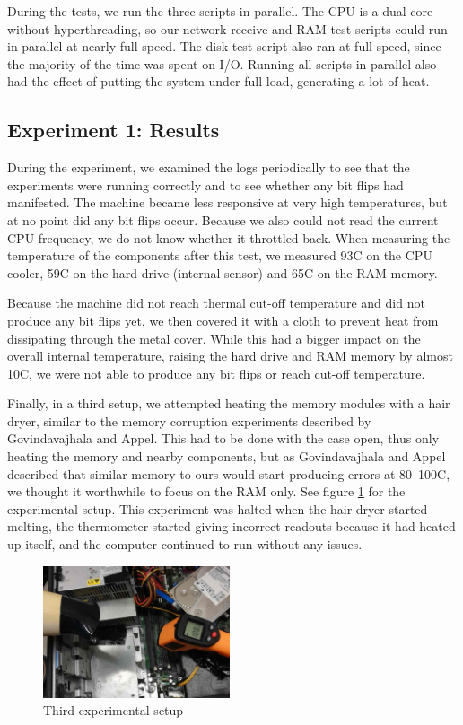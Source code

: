\documentclass[conference]{IEEEtran}
\begin{document}
During the tests, we run the three scripts in parallel. The CPU is a dual core
without hyperthreading, so our network receive and RAM test scripts could run
in parallel at nearly full speed. The disk test script also ran at full speed,
since the majority of the time was spent on I/O. Running all scripts in
parallel also had the effect of putting the system under full load, generating
a lot of heat.

\subsection{Experiment 1: Results}

During the experiment, we examined the logs periodically to see that the
experiments were running correctly and to see whether any bit flips had
manifested. The machine became less responsive at very high temperatures, but
at no point did any bit flips occur. Because we also could not read the current
CPU frequency, we do not know whether it throttled back. When measuring the
temperature of the components after this test, we measured 93\degree{}C on the
CPU cooler, 59\degree{}C on the hard drive (internal sensor) and 65\degree{}C
on the RAM memory.

Because the machine did not reach thermal cut-off temperature and did not
produce any bit flips yet, we then covered it with a cloth to prevent heat from
dissipating through the metal cover. While this had a bigger impact on the
overall internal temperature, raising the hard drive and RAM memory by almost
10\degree{}C, we were not able to produce any bit flips or reach cut-off
temperature.

Finally, in a third setup, we attempted heating the memory modules with a hair
dryer, similar to the memory corruption experiments described by Govindavajhala
and Appel\cite{jvm}. This had to be done with the case open, thus only heating
the memory and nearby components, but as Govindavajhala and Appel described
that similar memory to ours would start producing errors at 80--100\degree{}C,
we thought it worthwhile to focus on the RAM only. See figure
\ref{fig:hairdryer} for the experimental setup. This experiment was halted when
the hair dryer started melting, the thermometer started giving incorrect
readouts because it had heated up itself, and the computer continued to run
without any issues.

\begin{figure}
	\centering
	\includegraphics[width=0.49\textwidth]{hairdryer.jpg}
	\caption{Third experimental setup}
	\label{fig:hairdryer}
\end{figure}
\end{document}
